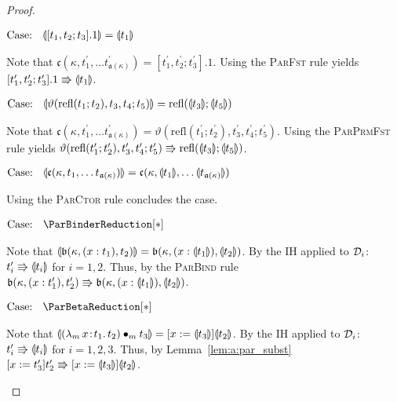 \begin{proof}
\begin{proofcase}
        $\text{Case: }\begin{array}{c} \llparenthesis {[t_1, t_2; t_3].1} \rrparenthesis = \llparenthesis {t_1} \rrparenthesis \end{array}$
        \begin{proofcase}
            Note that $\mathfrak{c}(\kappa, t_1^\prime, \ldots t^\prime_{\mathfrak{a}(\kappa)}) = [t_1^\prime, t_2^\prime; t_3^\prime].1$.
            Using the \textsc{ParFst} rule yields $[t_1^\prime, t_2^\prime; t_3^\prime].1 \Rrightarrow \llparenthesis {t_1} \rrparenthesis$.
        \end{proofcase}

        $\text{Case: }\begin{array}{c} \llparenthesis {\vartheta(\text{refl}(t_1; t_2), t_3, t_4; t_5)} \rrparenthesis = \textnormal{refl}(\llparenthesis {t_3} \rrparenthesis; \llparenthesis {t_5} \rrparenthesis) \end{array}$
        \begin{proofcase}
            Note that $\mathfrak{c}(\kappa, t_1^\prime, \ldots t^\prime_{\mathfrak{a}(\kappa)}) = \vartheta(\text{refl}(t_1^\prime; t_2^\prime), t_3^\prime, t_4^\prime; t_5^\prime)$.
            Using the \textsc{ParPrmFst} rule yields $\vartheta(\text{refl}(t_1^\prime; t_2^\prime), t_3^\prime, t_4^\prime; t_5^\prime) \Rrightarrow \textnormal{refl}(\llparenthesis {t_3} \rrparenthesis; \llparenthesis {t_5} \rrparenthesis)$.
        \end{proofcase}

        $\text{Case: }\begin{array}{c} \llparenthesis {\mathfrak{c}(\kappa, t_1, \ldots t_{\mathfrak{a}(\kappa)})} \rrparenthesis = \mathfrak{c}(\kappa, \llparenthesis {t_1} \rrparenthesis, \ldots \llparenthesis {t_{\mathfrak{a}(\kappa)}} \rrparenthesis) \end{array}$
        \begin{proofcase}
            Using the \textsc{ParCtor} rule concludes the case.
        \end{proofcase}
    \end{proofcase}

    $\text{Case: }\begin{array}{c} \ParBinderReduction[*] \end{array}$
    \begin{proofcase}
        Note that $\llparenthesis {\mathfrak{b}(\kappa, (x : t_1), t_2)} \rrparenthesis = \mathfrak{b}(\kappa, (x : \llparenthesis {t_1} \rrparenthesis), \llparenthesis {t_2} \rrparenthesis)$.
        By the IH applied to $\mathcal{D}_{i}$: $t_i^\prime \Rrightarrow \llparenthesis {t_i} \rrparenthesis$ for $i = 1, 2$.
        Thus, by the \textsc{ParBind} rule $\mathfrak{b}(\kappa, (x : t_1^\prime), t_2^\prime) \Rrightarrow \mathfrak{b}(\kappa, (x : \llparenthesis {t_1} \rrparenthesis), \llparenthesis {t_2} \rrparenthesis)$.
    \end{proofcase}

    $\text{Case: }\begin{array}{c} \ParBetaReduction[*] \end{array}$
    \begin{proofcase}
        Note that $\llparenthesis {({\lambda_m}\, x\! : \! t_1.\, t_2) \bullet_{m} t_3} \rrparenthesis = [x := \llparenthesis {t_3} \rrparenthesis]\llparenthesis {t_2} \rrparenthesis$.
        By the IH applied to $\mathcal{D}_{i}$: $t_i^\prime \Rrightarrow \llparenthesis {t_i} \rrparenthesis$ for $i = 1, 2, 3$.
        Thus, by Lemma~\ref{lem:a:par_subst} $[x := t_3^\prime]t_2^\prime \Rrightarrow [x := \llparenthesis {t_3} \rrparenthesis]\llparenthesis {t_2} \rrparenthesis$.
    \end{proofcase}


\end{proof}
